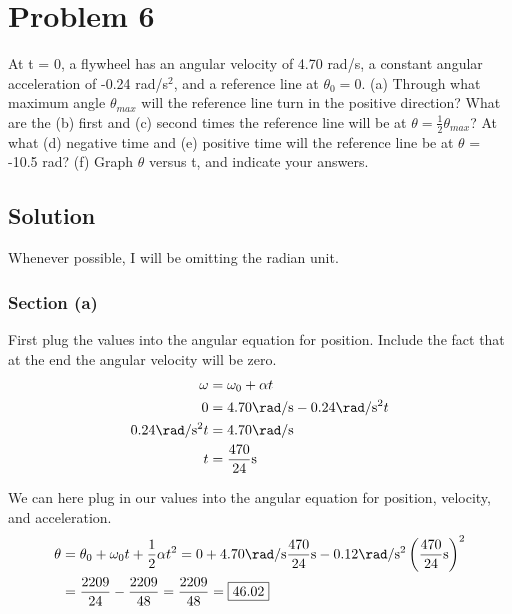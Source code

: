 \documentclass[12pt]{article}
\begin{document}
\pagebreak
\section*{Problem 6}
At t = 0, a flywheel has an angular velocity of 4.70 rad/s, a constant angular acceleration of
-0.24 rad/s$^2$, and a reference line at $\theta_0 = 0$. (a) Through what maximum angle $\theta_{max}$ will the
reference line turn in the positive direction? What are the (b) first and (c) second times the reference line will be at $\theta = \frac{1}{2}\theta_{max}$? At what (d) negative time and (e) positive time will the
reference line be at $\theta$ = -10.5 rad? (f) Graph $\theta$ versus t, and indicate your answers.

\subsection*{Solution}
Whenever possible, I will be omitting the radian unit. 
\subsubsection*{Section (a)}
First plug the values into the angular equation for position. Include the fact that at the end the angular velocity will be zero.
\begin{align*}
    \omega  &=  \omega_0 + \alpha t\\
    0   &=  4.70 \unit{\rad/\second} - 0.24 \unit{\rad/\second^2} t\\
    0.24 \unit{\rad/\second^2} t    &=  4.70 \unit{\rad/\second}\\
    t   &=  \frac{470}{24}\unit{\second}
\end{align*}

We can here plug in our values into the angular equation for position, velocity, and acceleration.
\begin{align*}
    \theta  &=  \theta_0 + \omega_0 t + \frac{1}{2}\alpha t^2
        =   0 + 4.70 \unit{\rad/\second} \frac{470}{24}\unit{\second} - 0.12 \unit{\rad/\second^2} \left(\frac{470}{24}\unit{\second}\right)^2\\
        &=  \frac{2209}{24} - \frac{2209}{48}
        =   \frac{2209}{48}
        =   \boxed{46.02}
\end{align*}
\end{document}
